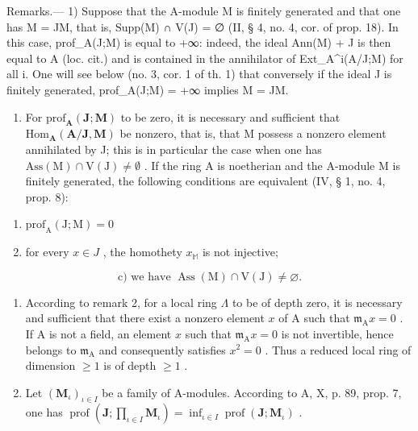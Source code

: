 Remarks.--- 1) Suppose that the A-module M is finitely generated and that one has M = JM, that is, Supp(M) ∩ V(J) = ∅ (II, § 4, no. 4, cor. of prop. 18). In this case, prof\_A(J;M) is equal to +∞: indeed, the ideal Ann(M) + J is then equal to A (loc. cit.) and is contained in the annihilator of Ext\_A\^{}i(A/J;M) for all i. One will see below (no. 3, cor. 1 of th. 1) that conversely if the ideal J is finitely generated, prof\_A(J;M) = +∞ implies M = JM.

\begin{enumerate}
\def\labelenumi{\arabic{enumi})}
\setcounter{enumi}{1}
\tightlist
\item
  For \(\mathrm{prof}_{\mathbf{A}}(\mathbf{J};\mathbf{M})\) to be zero, it is necessary and sufficient that \(\mathrm{Hom}_{\mathbf{A}}(\mathbf{A} / \mathbf{J},\mathbf{M})\) be nonzero, that is, that M possess a nonzero element annihilated by J; this is in particular the case when one has \(\mathrm{Ass(M)}\cap \mathrm{V(J)}\neq \emptyset\) . If the ring A is noetherian and the A-module M is finitely generated, the following conditions are equivalent (IV, § 1, no. 4, prop. 8):
\end{enumerate}

\begin{enumerate}
\def\labelenumi{\alph{enumi})}
\item
  \(\mathrm{prof}_{\mathrm{A}}(\mathrm{J};\mathrm{M}) = 0\)
\item
  for every \(x \in J\) , the homothety \(x_{\mathbb{M}}\) is not injective;
\end{enumerate}

\[
\mathrm{c)} \text {   we have   } \operatorname{Ass} (\mathrm{M}) \cap \mathrm{V} (\mathrm{J}) \neq \varnothing .
\]

\begin{enumerate}
\def\labelenumi{\arabic{enumi})}
\setcounter{enumi}{2}
\item
  According to remark 2, for a local ring \(\Lambda\) to be of depth zero, it is necessary and sufficient that there exist a nonzero element \(x\) of A such that \(\mathfrak{m}_{\mathrm{A}}x = 0\) . If A is not a field, an element \(x\) such that \(\mathfrak{m}_{\mathrm{A}}x = 0\) is not invertible, hence belongs to \(\mathfrak{m}_{\mathrm{A}}\) and consequently satisfies \(x^{2} = 0\) . Thus a reduced local ring of dimension \(\geqslant 1\) is of depth \(\geqslant 1\) .
\item
  Let \((\mathbf{M}_{\iota})_{\iota \in I}\) be a family of A-modules. According to A, X, p. 89, prop. 7, one has \(\operatorname{prof}(\mathbf{J};\prod_{\iota \in I}\mathbf{M}_{\iota}) = \inf_{\iota \in I}\operatorname{prof}(\mathbf{J};\mathbf{M}_{\iota})\) .
\end{enumerate}

